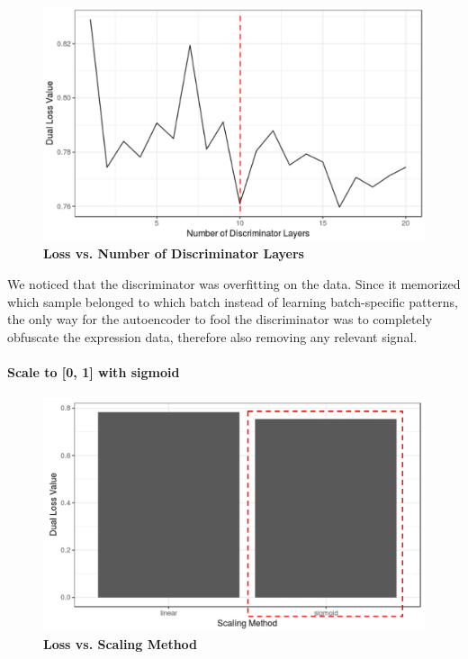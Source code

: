 \documentclass{article}
\begin{document}
\begin{figure}
	\centering
	\includegraphics[width=\columnwidth]{figures/supplement/disc_layers.png}
	\caption{\textbf{Loss vs. Number of Discriminator Layers}
	}
	\label{fig:disc}
\end{figure}

We noticed that the discriminator was overfitting on the data.
Since it memorized which sample belonged to which batch instead of learning batch-specific patterns, the only way for the autoencoder to fool the discriminator was to completely obfuscate the expression data, therefore also removing any relevant signal.

\paragraph{Scale to [0, 1] with sigmoid}

\begin{figure}
	\centering
	\includegraphics[width=\columnwidth]{figures/supplement/scaling.png}
	\caption{\textbf{Loss vs. Scaling Method}
	}
	\label{fig:scaling}
\end{figure}
\end{document}
